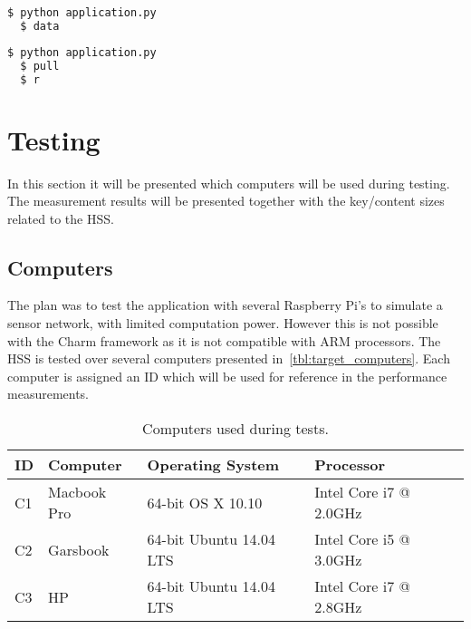 \begin{lstlisting}[language=bash, caption={Start a device registering a prefix.}, label={lst:data}]
  $ python application.py
  $ data
\end{lstlisting}

\begin{lstlisting}[language=bash, caption={Start a device that will express \gls{interest} in \gls{data}.}, label={lst:pull}]
  $ python application.py
  $ pull
  $ r
\end{lstlisting}

\section{Testing}
In this section it will be presented which computers will be used during testing. 
The measurement results will be presented together with the key/content sizes related to the \gls{HSS}.

\subsection{Computers}
The plan was to test the application with several Raspberry Pi's to simulate a sensor network, with limited computation power.
However this is not possible with the Charm framework as it is not compatible with ARM processors.
The \gls{HSS} is tested over several computers presented in~\autoref{tbl:target_computers}.
Each computer is assigned an ID which will be used for reference in the performance measurements.

\begin{table}[h]
  \begin{tabular}{llll}
  ID      & Computer                  & Operating System          & Processor                    \\ \hline
  C1      & Macbook Pro               & 64-bit OS X 10.10         & Intel Core i7 @ 2.0GHz       \\ %
  C2      & Garsbook                  & 64-bit Ubuntu 14.04 LTS   & Intel Core i5 @ 3.0GHz       \\ %
  C3      & HP                        & 64-bit Ubuntu 14.04 LTS   & Intel Core i7 @ 2.8GHz       \\ %
  \end{tabular}
  \caption{Computers used during tests.}
  \label{tbl:target_computers}
\end{table}

